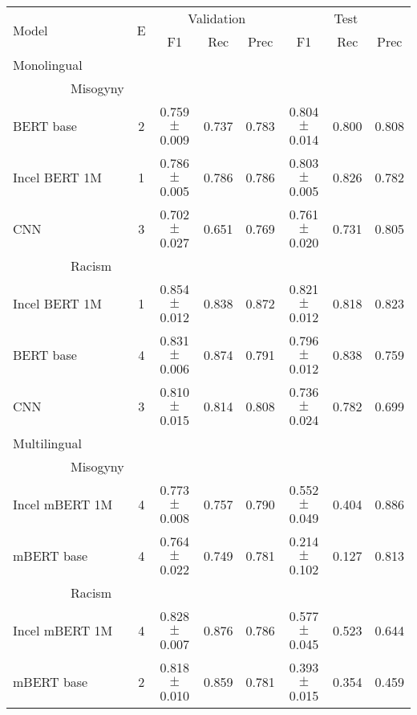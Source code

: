 \begin{tabular}{lc|ccc|ccc}
\hline
\multirow{2}{*}[0pt]{Model}   &     \multirow{2}{*}[0pt]{E}               &  \multicolumn{3}{c|}{Validation}              & \multicolumn{3}{c}{Test} \\
\cline{3-8}
&     &       F1  &    Rec &   Prec &        F1  &   Rec   &   Prec \\
\hline
Monolingual\\
~~~~~~~~~Misogyny\\
\hline
BERT base & 2 &  0.759 $\pm$          0.009 &    0.737 &     0.783 &    0.804 $\pm$           0.014 &     0.800 &      0.808 \\
Incel BERT 1M & 1 &  0.786 $\pm$          0.005 &    0.786 &     0.786 &    0.803 $\pm$           0.005 &     0.826 &      0.782 \\
CNN & 3 &  0.702 $\pm$          0.027 &    0.651 &     0.769 &    0.761 $\pm$           0.020 &     0.731 &      0.805 \\
\hline
~~~~~~~~~Racism\\
\hline
Incel BERT 1M & 1 &  0.854 $\pm$          0.012 &    0.838 &     0.872 &    0.821 $\pm$           0.012 &     0.818 &      0.823 \\
BERT base & 4 &  0.831 $\pm$          0.006 &    0.874 &     0.791 &    0.796 $\pm$           0.012 &     0.838 &      0.759 \\
CNN & 3 &  0.810 $\pm$          0.015 &    0.814 &     0.808 &    0.736 $\pm$           0.024 &     0.782 &      0.699 \\
\hline
Multilingual\\
~~~~~~~~~Misogyny\\
\hline
Incel mBERT 1M & 4 &  0.773 $\pm$          0.008 &    0.757 &     0.790 &    0.552 $\pm$           0.049 &     0.404 &      0.886 \\
mBERT base & 4 &  0.764 $\pm$          0.022 &    0.749 &     0.781 &    0.214 $\pm$           0.102 &     0.127 &      0.813 \\
\hline
~~~~~~~~~Racism\\
\hline
Incel mBERT 1M &  4 & 0.828 $\pm$          0.007 &    0.876 &     0.786 &    0.577 $\pm$           0.045 &     0.523 &      0.644 \\
mBERT base & 2 &  0.818 $\pm$          0.010 &    0.859 &     0.781 &    0.393 $\pm$           0.015 &     0.354 &      0.459 \\
\hline
\end{tabular}


